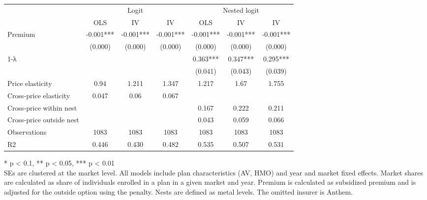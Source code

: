 \setlength{\LTpost}{0mm}
\begin{longtable}{lcccccc}
\toprule
 & \multicolumn{3}{c}{Logit} & \multicolumn{3}{c}{Nested logit} \\ 
\cmidrule(lr){2-4} \cmidrule(lr){5-7}
  & OLS & IV & IV & OLS & IV & IV \\ 
\midrule\addlinespace[2.5pt]
Premium & -0.001*** & -0.001*** & -0.001*** & -0.001*** & -0.001*** & -0.001*** \\ 
 & (0.000) & (0.000) & (0.000) & (0.000) & (0.000) & (0.000) \\ 
1-λ &  &  &  & 0.363*** & 0.347*** & 0.295*** \\ 
 &  &  &  & (0.041) & (0.043) & (0.039) \\ 
Price elasticity & 0.94 & 1.211 & 1.347 & 1.217 & 1.67 & 1.755 \\ 
Cross-price elasticity & 0.047 & 0.06 & 0.067 &  &  &  \\ 
Cross-price within nest &  &  &  & 0.167 & 0.222 & 0.211 \\ 
Cross-price outside nest &  &  &  & 0.043 & 0.059 & 0.066 \\ 
Observations & 1083 & 1083 & 1083 & 1083 & 1083 & 1083 \\ 
R2 & 0.446 & 0.430 & 0.482 & 0.535 & 0.507 & 0.531 \\ 
\bottomrule
\end{longtable}
\begin{minipage}{\linewidth}
* p < 0.1, ** p < 0.05, *** p < 0.01\\
SEs are clustered at the market level. All models include plan characteristics (AV, HMO) and year and market fixed effects. 
                   Market shares are calculated as share of individuals enrolled in a plan in a given market and year. 
                   Premium is calculated as subsidized premium and is adjusted for the outside option using the penalty. 
                   Nests are defined as metal levels. The omitted insurer is Anthem.\\
\end{minipage}

